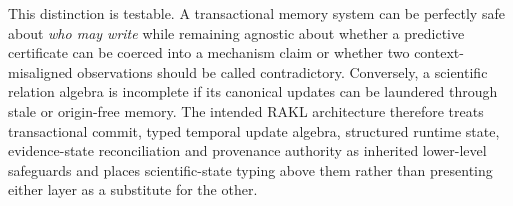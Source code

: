 This distinction is testable. A transactional memory system can be perfectly safe about \emph{who may write} while remaining agnostic about whether a predictive certificate can be coerced into a mechanism claim or whether two context-misaligned observations should be called contradictory. Conversely, a scientific relation algebra is incomplete if its canonical updates can be laundered through stale or origin-free memory. The intended RAKL architecture therefore treats transactional commit, typed temporal update algebra, structured runtime state, evidence-state reconciliation and provenance authority as inherited lower-level safeguards and places scientific-state typing above them rather than presenting either layer as a substitute for the other.
